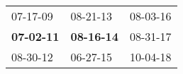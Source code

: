 \begin{supertabular}{p{0.33\columnwidth}p{0.33\columnwidth}p{0.33\columnwidth}}
          07-17-09\textsuperscript{} &           08-21-13\textsuperscript{} &  08-03-16\textsuperscript{} \\
 \textbf{07-02-11\textsuperscript{}} &  \textbf{08-16-14\textsuperscript{}} &  08-31-17\textsuperscript{} \\
          08-30-12\textsuperscript{} &           06-27-15\textsuperscript{} &  10-04-18\textsuperscript{} \\
\end{supertabular}
